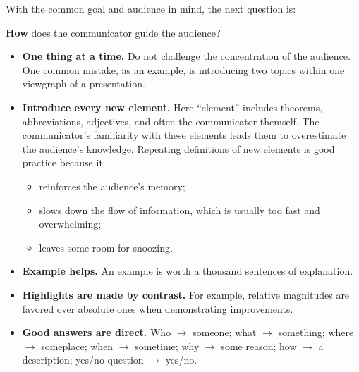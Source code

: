 \documentclass[%
reprint,
superscriptaddress,
nofootinbib,
 aps,
floatfix,
]{revtex4-2}
\begin{document}
With the common goal and audience in mind, the next question is:
\begin{center}
\textbf{How} does the communicator guide the audience?
\end{center}
\begin{itemize}
    \item \textbf{One thing at a time.} Do not challenge the concentration of the audience. 
    One common mistake, as an example, is introducing two topics within one viewgraph of a presentation.

    \item \textbf{Introduce every new element.} Here ``element'' includes theorems, abbreviations, adjectives, and often the communicator themself.
          The communicator's familiarity with these elements leads them to overestimate the audience's knowledge.
          Repeating definitions of new elements is good practice because it
          \begin{itemize}
              \item reinforces the audience's memory;
              \item slows down the flow of information, which is usually too fast and overwhelming;
              \item leaves some room for snoozing.
          \end{itemize}


    \item \textbf{Example helps.} An example is worth a thousand sentences of explanation.


    \item \textbf{Highlights are made by contrast.} For example, relative magnitudes are favored over absolute ones when demonstrating improvements.



    \item \textbf{Good answers are direct.} Who $\rightarrow$ someone; what $\rightarrow$ something; where $\rightarrow$ someplace; {when} $\rightarrow$ sometime; {why} $\rightarrow$ some reason; {how} $\rightarrow$ a description; yes/no question $\rightarrow$ yes/no.

\end{itemize}
\end{document}
